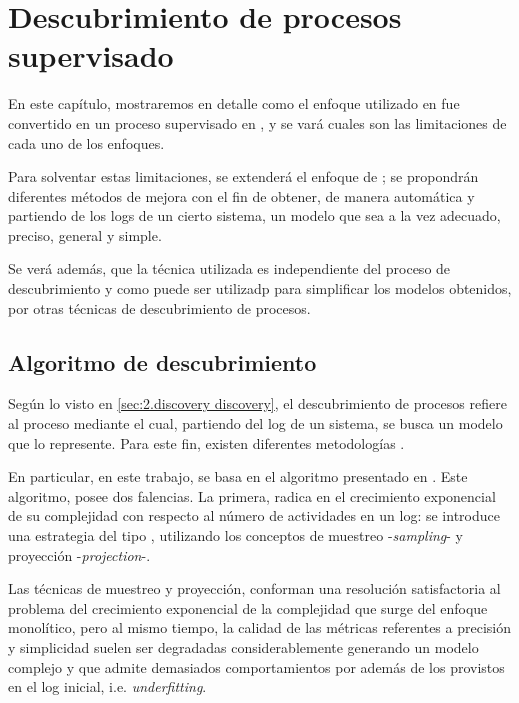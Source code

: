 \chapter{Descubrimiento de procesos supervisado}
\label{chap:3}
En este capítulo, mostraremos en detalle como el enfoque utilizado en \cite{CarmonaC14} 
fue convertido en un proceso supervisado en \cite{LeonCB15}, y se vará cuales son las 
limitaciones de cada uno de los enfoques.

Para solventar estas limitaciones, se extenderá el enfoque de \cite{LeonCB15};
se propondrán diferentes métodos de mejora con el fin de
obtener, de manera automática y partiendo de los logs de un cierto sistema, 
un modelo que sea a la vez  adecuado, preciso, general y simple.

Se verá además, que la técnica utilizada es independiente del proceso de descubrimiento
y como puede ser utilizadp para simplificar los modelos obtenidos, por otras técnicas 
de descubrimiento de procesos.

\section{Algoritmo de descubrimiento}
\label{sec:3.algodisco}

Según lo visto en \autoref{sec:2.discovery discovery}, el descubrimiento de procesos
refiere al proceso mediante el cual, partiendo del log de un sistema, se busca
un modelo que lo represente.
Para este fin, existen diferentes metodologías .

En particular, en este trabajo, se basa en el algoritmo presentado en \cite{CarmonaC14}.
Este algoritmo, posee dos falencias. La primera, radica en el crecimiento exponencial de 
su complejidad con respecto al número de actividades en un log: se introduce una
estrategia del tipo , utilizando los conceptos de muestreo -\textit{sampling}-
y proyección -\textit{projection}-.




Las técnicas de muestreo y proyección, conforman una resolución satisfactoria al problema del
crecimiento exponencial de la complejidad que surge del enfoque monolítico, pero al mismo 
tiempo, la calidad de las métricas referentes a precisión y simplicidad suelen ser degradadas
considerablemente generando un modelo complejo y que admite demasiados comportamientos
por además de los provistos en el log inicial, i.e. \textit{underfitting}.

